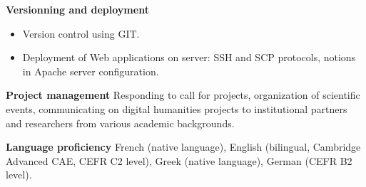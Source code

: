 \datedsubsection{ }
{}
{%
	\textbf{Versionning and deployment}}
{%
	\begin{itemize}
		\item Version control using GIT.
		\item Deployment of Web applications on server: SSH and SCP protocols, notions in Apache server configuration.
	\end{itemize}
}

\datedsubsection{ }
{}
{%
	\textbf{Project management}}
{%
	Responding to call for projects, organization of scientific events, communicating on digital humanities projects to institutional partners and researchers from various academic backgrounds.
}

\datedsubsection{ }
{}
{%
	\textbf{Language proficiency}}
{%
	French (native language), English (bilingual, Cambridge Advanced CAE, CEFR C2 level), Greek (native language), German (CEFR B2 level). }